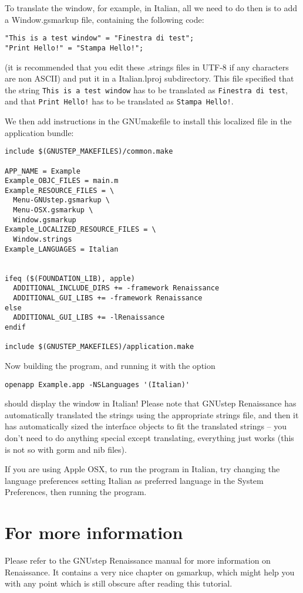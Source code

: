 \documentclass[a4paper]{article}
\begin{document}
To translate the window, for example, in Italian, all we need to do
then is to add a Window.gsmarkup file, containing the following code:
\begin{verbatim}
"This is a test window" = "Finestra di test";
"Print Hello!" = "Stampa Hello!";
\end{verbatim}
(it is recommended that you edit these .strings files in UTF-8 if any
characters are non ASCII) and put it in a Italian.lproj subdirectory.
This file specified that the string \texttt{This is a test window} has
to be translated as \texttt{Finestra di test}, and that \texttt{Print
Hello!} has to be translated as \texttt{Stampa Hello!}.

We then add instructions in the GNUmakefile to install this localized
file in the application bundle:
\begin{verbatim}
include $(GNUSTEP_MAKEFILES)/common.make

APP_NAME = Example
Example_OBJC_FILES = main.m
Example_RESOURCE_FILES = \
  Menu-GNUstep.gsmarkup \
  Menu-OSX.gsmarkup \
  Window.gsmarkup
Example_LOCALIZED_RESOURCE_FILES = \
  Window.strings
Example_LANGUAGES = Italian


ifeq ($(FOUNDATION_LIB), apple)
  ADDITIONAL_INCLUDE_DIRS += -framework Renaissance
  ADDITIONAL_GUI_LIBS += -framework Renaissance
else
  ADDITIONAL_GUI_LIBS += -lRenaissance
endif

include $(GNUSTEP_MAKEFILES)/application.make
\end{verbatim}

Now building the program, and running it with the option
\begin{verbatim}
openapp Example.app -NSLanguages '(Italian)' 
\end{verbatim}
should display the window in Italian!  Please note that GNUstep
Renaissance has automatically translated the strings using the
appropriate strings file, and then it has automatically sized the
interface objects to fit the translated strings -- you don't need to
do anything special except translating, everything just works (this is
not so with gorm and nib files).

If you are using Apple OSX, to run the program in Italian, try
changing the language preferences setting Italian as preferred
language in the System Preferences, then running the program.

\section{For more information}
Please refer to the GNUstep Renaissance manual for more information on
Renaissance.  It contains a very nice chapter on gsmarkup, which might
help you with any point which is still obscure after reading this
tutorial.
\end{document}
